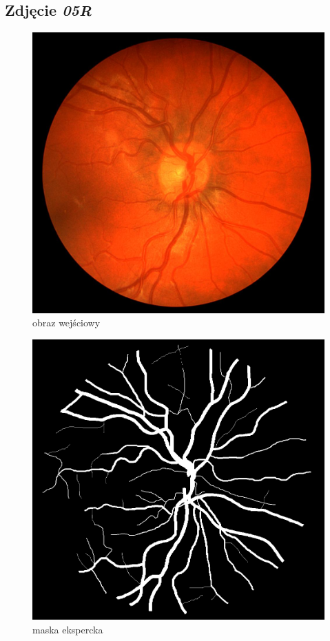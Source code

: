 \documentclass[polish,polish,a4paper]{article}
\begin{document}
		\subsection{Zdjęcie \textit{05R}}

\begin{figure}[!h]
	\centering
	\begin{minipage}{0.26\linewidth}
		\includegraphics[width=\linewidth]{../chase/Image_05R.jpg}
		\centering
			\small{obraz wejściowy}
	\end{minipage}
	\hfill
	\begin{minipage}{0.26\linewidth}
		\includegraphics[width=\linewidth]{../chase/Image_05R_1stHO.png}
		\centering
			\small{maska ekspercka}
	\end{minipage}
\end{figure}
\end{document}
